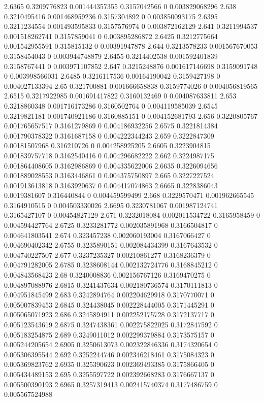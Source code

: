 {2.6365 0.3209776823 0.001444357355 0.3157042566 0 0.003829068296
2.638 0.3210495416 0.001468959236 0.3157304892 0 0.003850093175
2.6395 0.3211234554 0.001493595833 0.3157576974 0 0.003872162129
2.641 0.3211994537 0.001518262741 0.3157859041 0 0.003895286872
2.6425 0.3212775664 0.001542955591 0.315815132 0 0.00391947878
2.644 0.3213578233 0.001567670053 0.3158454043 0 0.003944748879
2.6455 0.3214402538 0.001592401839 0.3158767441 0 0.003971107852
2.647 0.3215248876 0.001617146698 0.3159091748 0 0.003998566031
2.6485 0.3216117536 0.00164190042 0.3159427198 0 0.004027133394
2.65 0.321700881 0.001666658838 0.3159774026 0 0.004056819565
2.6515 0.3217922985 0.001691417822 0.3160132469 0 0.004087633811
2.653 0.3218860348 0.001716173286 0.3160502764 0 0.004119585039
2.6545 0.3219821181 0.001740921186 0.3160885151 0 0.004152681793
2.656 0.3220805767 0.001765657517 0.3161279869 0 0.004186932256
2.6575 0.3221814384 0.001790378322 0.3161687158 0 0.004222344243
2.659 0.3222847309 0.00181507968 0.316210726 0 0.004258925205
2.6605 0.3223904815 0.001839757718 0.3162540416 0 0.004296682222
2.662 0.3224987175 0.001864408605 0.3162986869 0 0.004335622006
2.6635 0.3226094656 0.001889028553 0.3163446861 0 0.004375750897
2.665 0.3227227524 0.001913613818 0.3163920637 0 0.004417074863
2.6665 0.3228386043 0.0019381607 0.316440844 0 0.004459599499
2.668 0.3229570471 0.001962665545 0.3164910515 0 0.004503330026
2.6695 0.3230781067 0.001987124741 0.3165427107 0 0.00454827129
2.671 0.3232018084 0.002011534722 0.3165958459 0 0.004594427764
2.6725 0.3233281772 0.002035891968 0.3166504817 0 0.004641803541
2.674 0.323457238 0.002060193004 0.3167066427 0 0.004690402342
2.6755 0.3235890151 0.002084434399 0.3167643532 0 0.004740227507
2.677 0.3237235327 0.00210861277 0.3168236379 0 0.004791282005
2.6785 0.3238608144 0.002132724776 0.3168845212 0 0.004843568423
2.68 0.3240008836 0.002156767126 0.3169470275 0 0.004897088976
2.6815 0.3241437634 0.002180736574 0.3170111813 0 0.004951845499
2.683 0.3242894764 0.002204629918 0.3170770071 0 0.005007839453
2.6845 0.324438045 0.002228444005 0.3171445291 0 0.005065071923
2.686 0.3245894911 0.002252175728 0.3172137717 0 0.005123543619
2.6875 0.3247438361 0.002275822025 0.3172847592 0 0.005183254875
2.689 0.3249011012 0.002299379884 0.3173575157 0 0.005244205654
2.6905 0.3250613073 0.002322846336 0.3174320654 0 0.005306395544
2.692 0.3252244746 0.002346218461 0.3175084323 0 0.005369823762
2.6935 0.325390623 0.002369493385 0.3175866405 0 0.005434489153
2.695 0.3255597722 0.002392668283 0.3176667137 0 0.005500390193
2.6965 0.3257319413 0.002415740374 0.3177486759 0 0.005567524988
}
